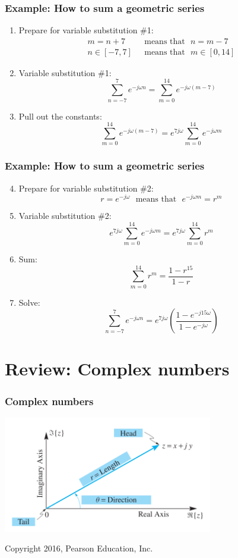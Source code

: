 \documentclass{beamer}
\begin{document}
\begin{frame}
  \frametitle{Example: How to sum a geometric series}
  \centerline{}
  \begin{enumerate}
  \item Prepare for variable substitution \#1:
    \begin{align*}
      m=n+7 &~~~\mbox{means that}~~~ n=m-7 \\
      n\in [-7,7] &~~~\mbox{means that}~~~ m\in [0,14]
    \end{align*}
  \item Variable substitution \#1:
    \[
    \sum_{n=-7}^7 e^{-j\omega n} =\sum_{m=0}^{14} e^{-j\omega (m-7)}
    \]
  \item Pull out the constants:
    \[
    \sum_{m=0}^{14} e^{-j\omega (m-7)} =e^{7j\omega}\sum_{m=0}^{14}e^{-j\omega m}
    \]
  \end{enumerate}
\end{frame}
\begin{frame}
  \frametitle{Example: How to sum a geometric series}
  \begin{enumerate}
    \setcounter{enumi}{3}
  \item Prepare for variable substitution \#2:
    \[
    r=e^{-j\omega} ~~~\mbox{means that}~~~  e^{-j\omega m}=r^m
    \]
  \item Variable substitution \#2:
    \[
    e^{7j\omega}\sum_{m=0}^{14}e^{-j\omega m} = e^{7j\omega}\sum_{m=0}^{14}r^m
    \]
  \item Sum:
    \[
    \sum_{m=0}^{14}r^m=\frac{1-r^{15}}{1-r}
    \]
  \item Solve:
    \[
    \sum_{n=-7}^7 e^{-j\omega n} = e^{7j\omega}\left(\frac{1-e^{-j15\omega}}{1-e^{-j\omega}}\right)
    \]
  \end{enumerate}
\end{frame}

\section[Complex Numbers]{Review: Complex numbers}
\setcounter{subsection}{1}

\begin{frame}
  \frametitle{Complex numbers}
  \centerline{\includegraphics[height=2in]{fig3.png}}
  \begin{tiny}
    Copyright 2016, Pearson Education, Inc.
  \end{tiny}
\end{frame}
\end{document}
